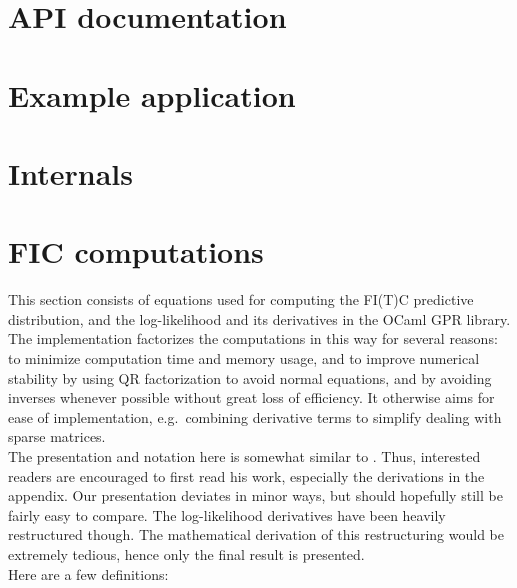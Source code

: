 \documentclass[10pt]{report}
\begin{document}
\chapter{API documentation}

\chapter{Example application}

\chapter{Internals}

\appendix

\chapter{FIC computations}

This section consists of equations used for computing the FI(T)C
predictive distribution, and the log-likelihood and its derivatives
in the OCaml GPR library.  The implementation factorizes the
computations in this way for several reasons: to minimize computation
time and memory usage, and to improve numerical stability by using
QR factorization to avoid normal equations, and by avoiding inverses
whenever possible without great loss of efficiency.  It otherwise
aims for ease of implementation, e.g.\ combining derivative terms
to simplify dealing with sparse matrices.\\

The presentation and notation here is somewhat similar to
\cite{SnelsonThesis}.  Thus, interested readers are encouraged to
first read his work, especially the derivations in the appendix.
Our presentation deviates in minor ways, but should hopefully still
be fairly easy to compare.  The log-likelihood derivatives have
been heavily restructured though.  The mathematical derivation of
this restructuring would be extremely tedious, hence only the final
result is presented.\\

Here are a few definitions:
\end{document}
